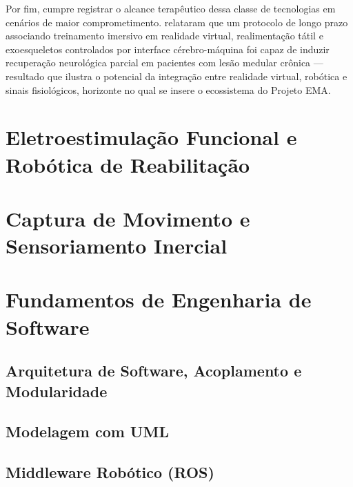 Por fim, cumpre registrar o alcance terapêutico dessa classe de tecnologias em cenários de
maior comprometimento.  relataram que um protocolo de longo prazo
associando treinamento imersivo em realidade virtual, realimentação tátil e exoesqueletos
controlados por interface cérebro-máquina foi capaz de induzir recuperação neurológica
parcial em pacientes com lesão medular crônica --- resultado que ilustra o potencial da
integração entre realidade virtual, robótica e sinais fisiológicos, horizonte no qual se
insere o ecossistema do Projeto EMA.

\section{Eletroestimulação Funcional e Robótica de Reabilitação}

\section{Captura de Movimento e Sensoriamento Inercial}

\section{Fundamentos de Engenharia de Software}

\subsection{Arquitetura de Software, Acoplamento e Modularidade}

\subsection{Modelagem com UML}

\subsection{Middleware Robótico (ROS)}
